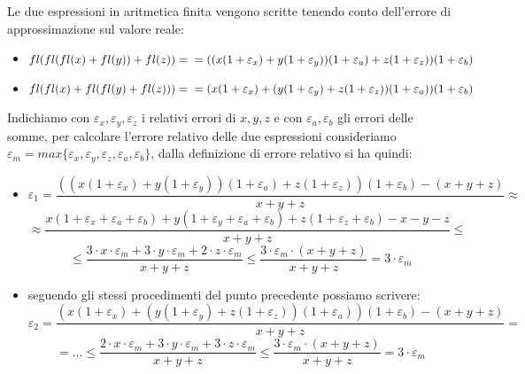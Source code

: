 Le due espressioni in aritmetica finita vengono scritte tenendo conto dell'errore di approssimazione sul valore reale:
\begin{itemize}
\item $fl(fl(fl(x)+fl(y))+fl(z)) = \\ = ((x(1+\varepsilon_{x})+y(1+\varepsilon_{y}))(1+\varepsilon_{a})+z(1+\varepsilon_{z}))(1+\varepsilon_{b})$
\item $fl(fl(x)+fl(fl(y)+fl(z))) = \\ = (x(1+\varepsilon_{x})+(y(1+\varepsilon_{y})+z(1+\varepsilon_{z}))(1+\varepsilon_{a}))(1+\varepsilon_{b})$
\end{itemize}
Indichiamo con $\varepsilon_{x},\varepsilon_{y},\varepsilon_{z}$ i relativi errori di $x, y, z$ e con $\varepsilon_{a},\varepsilon_{b}$ gli errori delle somme, per calcolare l'errore relativo delle due espressioni consideriamo $\varepsilon_{m} = max\{\varepsilon_{x},\varepsilon_{y},\varepsilon_{z},\varepsilon_{a},\varepsilon_{b}\}$, dalla definizione di errore relativo si ha quindi:
\begin{itemize}
    \item 
    \[ 
    \varepsilon_{1} = \frac{((x(1+\varepsilon_{x})+y(1+\varepsilon_{y}))(1+\varepsilon_{a})+z(1+\varepsilon_{z}))(1+\varepsilon_{b})-(x+y+z)}{x+y+z} \approx
    \]
    \[
    \approx \frac{x(1+\varepsilon_{x}+\varepsilon_{a}+\varepsilon_{b})+y(1+\varepsilon_{y}+\varepsilon_{a}+\varepsilon_{b})+z(1+\varepsilon_{z}+\varepsilon_{b})-x-y-z}{x+y+z} \leq
    \]
    \[ 
    \leq \frac{3\cdot x\cdot\varepsilon_{m}+ 3\cdot y\cdot\varepsilon_{m} + 2\cdot z\cdot\varepsilon_{m}}{x+y+z} \leq \frac{3\cdot\varepsilon_{m}\cdot(x+y+z)}{x+y+z} = 3\cdot\varepsilon_{m}
    \]
    \item seguendo gli stessi procedimenti del punto precedente possiamo scrivere:
    \[
    \varepsilon_{2} = \frac{(x(1+\varepsilon_{x})+(y(1+\varepsilon_{y})+z(1+\varepsilon_{z}))(1+\varepsilon_{a}))(1+\varepsilon_{b})-(x+y+z)}{x+y+z} = 
    \]
    \[
    = ... \leq \frac{2\cdot x\cdot\varepsilon_{m}+ 3\cdot y\cdot\varepsilon_{m} + 3\cdot z\cdot\varepsilon_{m}}{x+y+z} \leq \frac{3\cdot\varepsilon_{m}\cdot(x+y+z)}{x+y+z} = 3\cdot\varepsilon_{m}
    \]
\end{itemize}